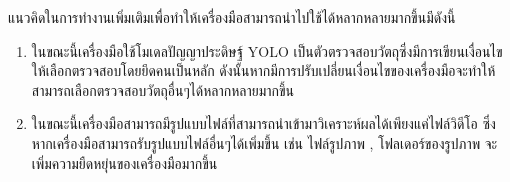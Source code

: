 แนวคิดในการทำงานเพิ่มเติมเพื่อทำให้เครื่องมือสามารถนำไปใช้ได้หลากหลายมากขึ้นมีดังนี้
\begin{enumerate}
	\item ในขณะนี้เครื่องมือใช้โมเดลปัญญาประดิษฐ์ YOLO เป็นตัวตรวจสอบวัตถุซึ่งมีการเขียนเงื่อนไขให้เลือกตรวจสอบโดยยึดคนเป็นหลัก  ดังนั้นหากมีการปรับเปลี่ยนเงื่อนไขของเครื่องมือจะทำให้สามารถเลือกตรวจสอบวัตถุอื่นๆได้หลากหลายมากขึ้น
	\item ในขณะนี้เครื่องมือสามารถมีรูปแบบไฟล์ที่สามารถนำเข้ามาวิเคราะห์ผลได้เพียงแค่ไฟล์วิดีโอ ซึ่งหากเครื่องมือสามารถรับรูปแบบไฟล์อื่นๆได้เพิ่มขึ้น เช่น ไฟล์รูปภาพ , โฟลเดอร์ของรูปภาพ จะเพิ่มความยืดหยุ่นของเครื่องมือมากขึ้น
\end{enumerate}